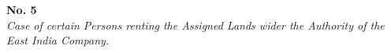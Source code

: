 



\PRLsep
\begin{center}
  \textbf{\large No. 5}
  \\\textit{Case of certain Persons renting the Assigned Lands wider the Authority of the East India Company.}
  \par 
\end{center}

